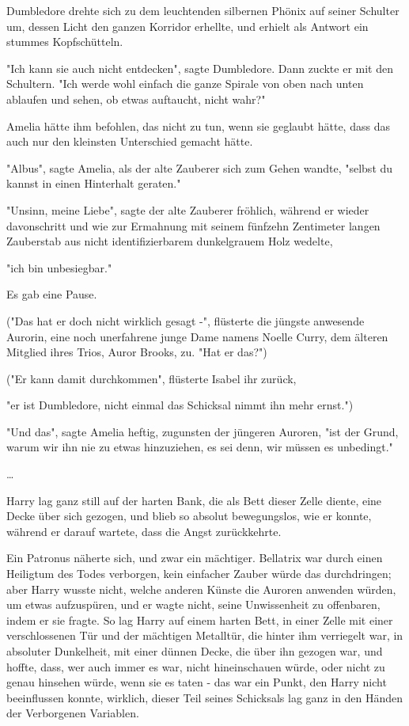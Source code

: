 {Dumbledore drehte sich zu dem leuchtenden silbernen Phönix auf seiner Schulter um, dessen Licht den ganzen Korridor erhellte, und erhielt als Antwort ein stummes Kopfschütteln.

"Ich kann sie auch nicht entdecken", sagte Dumbledore. Dann zuckte er mit den Schultern. "Ich werde wohl einfach die ganze Spirale von oben nach unten ablaufen und sehen, ob etwas auftaucht, nicht wahr?"

Amelia hätte ihm befohlen, das nicht zu tun, wenn sie geglaubt hätte, dass das auch nur den kleinsten Unterschied gemacht hätte.

"Albus", sagte Amelia, als der alte Zauberer sich zum Gehen wandte, "selbst du kannst in einen Hinterhalt geraten."

"Unsinn, meine Liebe", sagte der alte Zauberer fröhlich, während er wieder davonschritt und wie zur Ermahnung mit seinem fünfzehn Zentimeter langen Zauberstab aus nicht identifizierbarem dunkelgrauem Holz wedelte,

"ich bin unbesiegbar."

Es gab eine Pause.

("Das hat er doch nicht wirklich gesagt -", flüsterte die jüngste anwesende Aurorin, eine noch unerfahrene junge Dame namens Noelle Curry, dem älteren Mitglied ihres Trios, Auror Brooks, zu. "Hat er das?")

("Er kann damit durchkommen", flüsterte Isabel ihr zurück,

"er ist Dumbledore, nicht einmal das Schicksal nimmt ihn mehr ernst.")

"Und das", sagte Amelia heftig, zugunsten der jüngeren Auroren, "ist der Grund, warum wir ihn nie zu etwas hinzuziehen, es sei denn, wir müssen es unbedingt."

…

Harry lag ganz still auf der harten Bank, die als Bett dieser Zelle diente, eine Decke über sich gezogen, und blieb so absolut bewegungslos, wie er konnte, während er darauf wartete, dass die Angst zurückkehrte.

Ein Patronus näherte sich, und zwar ein mächtiger. Bellatrix war durch einen Heiligtum des Todes verborgen, kein einfacher Zauber würde das durchdringen; aber Harry wusste nicht, welche anderen Künste die Auroren anwenden würden, um etwas aufzuspüren, und er wagte nicht, seine Unwissenheit zu offenbaren, indem er sie fragte. So lag Harry auf einem harten Bett, in einer Zelle mit einer verschlossenen Tür und der mächtigen Metalltür, die hinter ihm verriegelt war, in absoluter Dunkelheit, mit einer dünnen Decke, die über ihn gezogen war, und hoffte, dass, wer auch immer es war, nicht hineinschauen würde, oder nicht zu genau hinsehen würde, wenn sie es taten - das war ein Punkt, den Harry nicht beeinflussen konnte, wirklich, dieser Teil seines Schicksals lag ganz in den Händen der Verborgenen Variablen.

}
